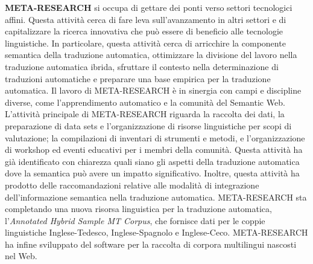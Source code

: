 \documentclass[]{../../metanetpaper}
\begin{document}
\begin{multicols}{2}
\textbf{META-RESEARCH} si occupa di gettare dei ponti verso settori tecnologici affini. Questa attivit\`{a} cerca di fare leva sull'avanzamento in altri settori e di capitalizzare la ricerca innovativa che pu\`{o} essere di beneficio alle tecnologie linguistiche. In particolare, questa attivit\`{a} cerca di arricchire la componente semantica della traduzione automatica, ottimizzare la divisione del lavoro nella traduzione automatica ibrida, sfruttare il contesto nella determinazione di traduzioni automatiche e preparare una base empirica per la traduzione automatica. Il lavoro di META-RESEARCH \`{e} in sinergia con campi e discipline diverse, come l'apprendimento automatico e la comunit\`{a} del Semantic Web. L'attivit\`{a} principale di META-RESEARCH riguarda la raccolta dei dati, la preparazione di data sets e l'organizzazione di risorse linguistiche per scopi di valutazione; la compilazioni di inventari di strumenti e metodi, e l'organizzazione di workshop ed eventi educativi per i membri della comunit\`{a}. Questa attivit\`{a} ha gi\`{a} identificato con chiarezza quali siano gli aspetti della traduzione automatica dove la semantica pu\`{o} avere un impatto significativo. Inoltre, questa attivit\`{a} ha prodotto delle raccomandazioni relative alle modalit\`{a} di integrazione dell'informazione semantica nella traduzione automatica. META-RESEARCH sta completando una nuova risorsa linguistica per la traduzione automatica, l'\emph{Annotated Hybrid Sample MT Corpus}, che fornisce dati per le coppie linguistiche Inglese-Tedesco, Inglese-Spagnolo e Inglese-Ceco. META-RESEARCH ha infine sviluppato del software per la raccolta di corpora multilingui nascosti nel Web.
\end{multicols}


\setcounter{section}{0}
\setcounter{figure}{0}

\cleardoublepage


\end{document}
